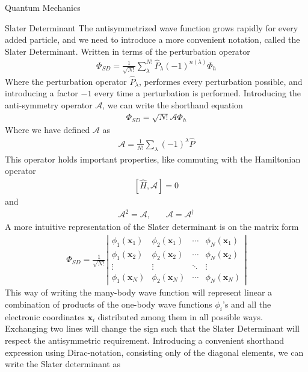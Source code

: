 \documentclass[twoside,english]{uiofysmaster}
\begin{document}
\begin{chapter}{Quantum Mechanics}
	\begin{section}{Slater Determinant}
		The antisymmetrized wave function grows rapidly for every added particle, and we need to introduce a more convenient notation, called the Slater Determinant. Written in terms of the perturbation operator \cite{Audun}
		\begin{align}
			\Phi_{SD} = \frac{1}{\sqrt{N!}} \sum_\lambda^{N!} \hat P_\lambda (-1)^{n(\lambda)} \Phi_h		 	
		\end{align} 
		Where the perturbation operator $\hat P_{\lambda}$, performes every perturbation possible, and introducing a factor $-1$ every time a perturbation is performed. Introducing the anti-symmetry operator $\mathcal{A}$, we can write the shorthand equation
		\begin{align}
			\Phi_{SD} = \sqrt{N!}\mathcal{A}\Phi_h
			\label{equation:SlaterDeterminant}
		\end{align}
		Where we have defined $\mathcal{A}$ as \cite{MHJSlides}
		\begin{align}
			\mathcal{A} = \frac{1}{N!} \sum_\lambda (-1)^\lambda \hat P
		\end{align}
		This operator holds important properties, like commuting with the Hamiltonian operator
		\begin{align}
			\left[\hat H, \mathcal{A}\right] = 0
		\end{align}
		and 
		\begin{align}
			\mathcal{A}^2 = \mathcal{A}, \:\:\:\:\:\:\:\: \mathcal{A} = \mathcal{A}^\dagger
			\label{equation:OperatorA}
		\end{align}
		A more intuitive representation of the Slater determinant is on the matrix form 
		\begin{align}
			\Phi_{SD} = \frac{1}{ \sqrt{N!} } \left|\begin{matrix}
				\phi_1(\mathbf{x}_1) & \phi_2(\mathbf{x}_1) & \cdots & \phi_N(\mathbf{x}_1) \\
				\phi_1(\mathbf{x}_2) & \phi_2(\mathbf{x}_2) & \cdots & \phi_N(\mathbf{x}_2) \\
				\vdots & \vdots & \ddots & \vdots \\
				\phi_1(\mathbf{x}_N) & \phi_2(\mathbf{x}_N) & \cdots & \phi_N(\mathbf{x}_N) 
			\end{matrix} \right|
		\end{align}
		This way of writing the many-body wave function will represent linear a combination of products of the one-body wave functions $\phi_i$'s and all the electronic coordinates $\mathbf{x}_i$ distributed among them in all possible ways. Exchanging two lines will change the sign such that the Slater Determinant will respect the antisymmetric requirement. Introducing a convenient shorthand expression using Dirac-notation, consisting only of the diagonal elements, we can write the Slater determinant as \cite{Crawford}

\end{section}
\end{chapter}
\end{document}
